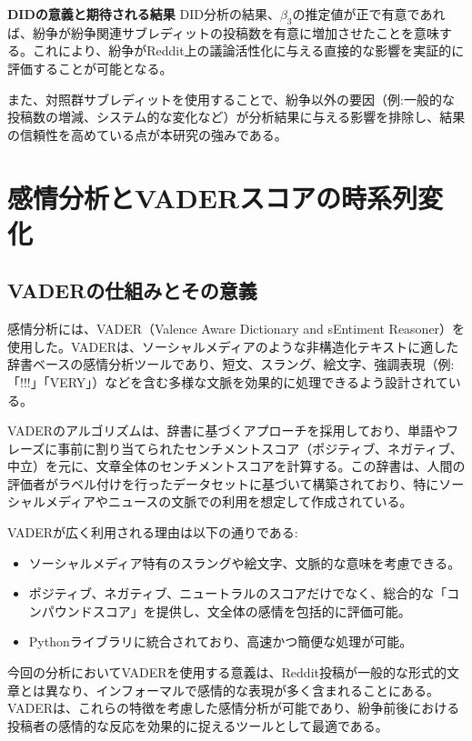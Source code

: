 \documentclass[11pt, a4j]{jreport}
\begin{document}
    \textbf{DIDの意義と期待される結果}
    DID分析の結果、$\beta_{3}$の推定値が正で有意であれば、紛争が紛争関連サブレディットの投稿数を有意に増加させたことを意味する。これにより、紛争がReddit上の議論活性化に与える直接的な影響を実証的に評価することが可能となる。

    また、対照群サブレディットを使用することで、紛争以外の要因（例:一般的な投稿数の増減、システム的な変化など）が分析結果に与える影響を排除し、結果の信頼性を高めている点が本研究の強みである。

    \section{感情分析とVADERスコアの時系列変化}

    \subsection*{VADERの仕組みとその意義}
    感情分析には、VADER（Valence Aware Dictionary and sEntiment Reasoner）を使用した。VADERは、ソーシャルメディアのような非構造化テキストに適した辞書ベースの感情分析ツールであり、短文、スラング、絵文字、強調表現（例:「!!!」「VERY」）などを含む多様な文脈を効果的に処理できるよう設計されている。

    VADERのアルゴリズムは、辞書に基づくアプローチを採用しており、単語やフレーズに事前に割り当てられたセンチメントスコア（ポジティブ、ネガティブ、中立）を元に、文章全体のセンチメントスコアを計算する。この辞書は、人間の評価者がラベル付けを行ったデータセットに基づいて構築されており、特にソーシャルメディアやニュースの文脈での利用を想定して作成されている。

    VADERが広く利用される理由は以下の通りである:
    \begin{itemize}
        \item ソーシャルメディア特有のスラングや絵文字、文脈的な意味を考慮できる。
        \item ポジティブ、ネガティブ、ニュートラルのスコアだけでなく、総合的な「コンパウンドスコア」を提供し、文全体の感情を包括的に評価可能。
        \item Pythonライブラリに統合されており、高速かつ簡便な処理が可能。
    \end{itemize}

    今回の分析においてVADERを使用する意義は、Reddit投稿が一般的な形式的文章とは異なり、インフォーマルで感情的な表現が多く含まれることにある。VADERは、これらの特徴を考慮した感情分析が可能であり、紛争前後における投稿者の感情的な反応を効果的に捉えるツールとして最適である。
\end{document}
